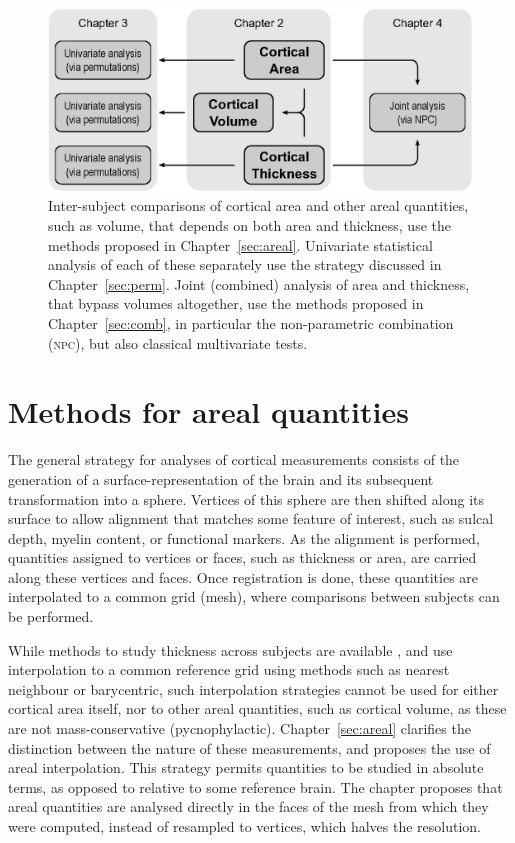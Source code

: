 \begin{figure}[tbp]
\begin{center}
\centerline{\includegraphics{images/flow.eps}}
\end{center}
\caption[The three ]{Inter-subject comparisons of cortical area and other areal quantities, such as volume, that depends on both area and thickness, use the methods proposed in Chapter~\ref{sec:areal}. Univariate statistical analysis of each of these separately use the strategy discussed in Chapter~\ref{sec:perm}. Joint (combined) analysis of area and thickness, that bypass volumes altogether, use the methods proposed in Chapter~\ref{sec:comb}, in particular the non-parametric combination (\textsc{npc}), but also classical multivariate tests.}
\label{fig:intro:flow}
\end{figure}

\section{Methods for areal quantities}

The general strategy for analyses of cortical measurements consists of the generation of a surface-representation of the brain and its subsequent transformation into a sphere. Vertices of this sphere are then shifted along its surface to allow alignment that matches some feature of interest, such as sulcal depth, myelin content, or functional markers. As the alignment is performed, quantities assigned to vertices or faces, such as thickness or area, are carried along these vertices and faces. Once registration is done, these quantities are interpolated to a common grid (mesh), where comparisons between subjects can be performed.  

While methods to study thickness across subjects are available \citep{Fischl2000}, and use interpolation to a common reference grid using methods such as nearest neighbour or barycentric, such interpolation strategies cannot be used for either cortical area itself, nor to other areal quantities, such as cortical volume, as these are not mass-conservative (pycnophylactic). Chapter~\ref{sec:areal} clarifies the distinction between the nature of these measurements, and proposes the use of areal interpolation. This strategy permits quantities to be studied in absolute terms, as opposed to relative to some reference brain. The chapter proposes that areal quantities are analysed directly in the faces of the mesh from which they were computed, instead of resampled to vertices, which halves the resolution.

